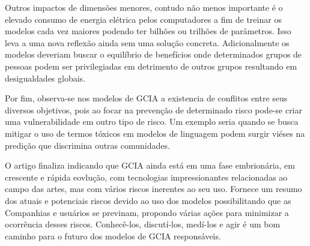 Outros impactos de dimensões menores, contudo não menos importante é o elevado consumo de energia elétrica pelos computadores a fim de treinar os modelos 
cada vez maiores podendo ter bilhões ou trilhões de parâmetros. Isso leva a uma nova reflexão ainda sem uma solução 
concreta. Adicionalmente os modelos deveriam buscar o equilíbrio de benefícios onde determinados grupos de 
pessoas podem ser privilegiadas em detrimento de outros grupos resultando em desigualdades globais.

Por fim, observa-se nos modelos de GCIA a existencia de conflitos entre seus diversos objetivos, pois ao focar na prevenção 
de determinado risco pode-se criar uma vulnerabilidade em outro tipo de risco. Um exemplo seria quando se busca mitigar 
o uso de termos tóxicos em modelos de linguagem podem surgir viéses na predição que discrimina outras 
comunidades.

O artigo finaliza indicando que GCIA ainda está em uma fase embrionária, em crescente e rápida eovlução, 
com tecnologias impressionantes relacionadas ao campo das artes, mas com vários riscos inerentes ao seu uso. 
Fornece um resumo dos atuais e potenciais riscos devido ao uso dos modelos possibilitando que as Companhias
e usuários se previnam, propondo várias ações para minimizar a ocorrência desses riscos.
Conhecê-los, discutí-los, medí-los e agir é um bom caminho para o futuro dos modelos de GCIA responsáveis.
